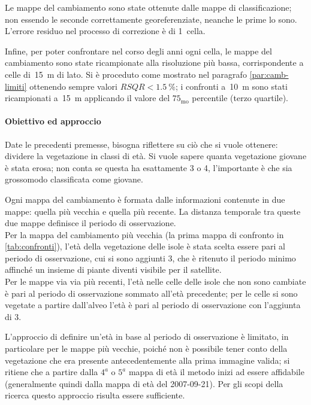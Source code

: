 Le mappe del cambiamento sono state ottenute dalle mappe di classificazione; non essendo le seconde correttamente georeferenziate, neanche le prime lo sono. L'errore residuo nel processo di correzione è di 1~cella.

Infine, per poter confrontare nel corso degli anni ogni cella, le mappe del cambiamento sono state ricampionate alla risoluzione più bassa, corrispondente a celle di~\SI{15}{\m} di lato. Si è proceduto come mostrato nel paragrafo \ref{par:camb-limiti} ottenendo sempre valori $RSQR < \SI{1.5}{\percent}$; i confronti a~\SI{10}{\m} sono stati ricampionati a~\SI{15}{\m} applicando il valore del $75_\mathrm{mo}$ percentile (terzo quartile).
 


\paragraph{Obiettivo ed approccio} 
Date le precedenti premesse, bisogna riflettere su ciò che si vuole ottenere: dividere la vegetazione in classi di età.
Si vuole sapere quanta vegetazione giovane è stata erosa; non conta se questa ha esattamente \SI{3}{\anni} o \SI{4}{\anni}, l'importante è che sia grossomodo classificata come giovane.

Ogni mappa del cambiamento è formata dalle informazioni contenute in due mappe: quella più vecchia e quella più recente. La distanza temporale tra queste due mappe definisce il periodo di osservazione.
\\
Per la mappa del cambiamento più vecchia (la prima mappa di confronto in \vref{tab:confronti}), l'età della vegetazione delle isole è stata scelta essere pari al periodo di osservazione, cui si sono aggiunti \SI{3}{\anni}, che è ritenuto il periodo minimo affinché un insieme di piante diventi visibile per il satellite.
\\
Per le mappe via via più recenti, l'età nelle celle delle isole che non sono cambiate è pari al periodo di osservazione sommato all'età precedente; per le celle si sono vegetate a partire dall'alveo l'età è pari al periodo di osservazione con l'aggiunta di \SI{3}{\anni}.

L'approccio di definire un'età in base al periodo di osservazione è limitato, in particolare per le mappe più vecchie, poiché non è possibile tener conto della vegetazione che era presente antecedentemente alla prima immagine valida;
si ritiene che a partire dalla $4^a$ o $5^a$ mappa di età il metodo inizi ad essere affidabile (generalmente quindi dalla mappa di età del 2007-09-21).
Per gli scopi della ricerca questo approccio risulta essere sufficiente.

